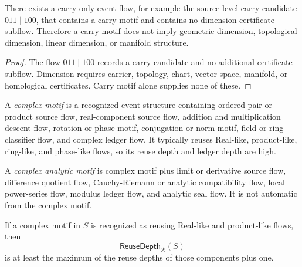\begin{theorem}
\label{thm:higher-case-carry-not-dimension}
There exists a carry-only event flow, for example the source-level carry candidate $011\mid 100$, that contains a carry motif and contains no dimension-certificate subflow. Therefore a carry motif does not imply geometric dimension, topological dimension, linear dimension, or manifold structure.
\end{theorem}

\begin{proof}
The flow $011\mid 100$ records a carry candidate and no additional certificate subflow. Dimension requires carrier, topology, chart, vector-space, manifold, or homological certificates. Carry motif alone supplies none of these.
\end{proof}

\begin{definition}
\label{def:higher-case-complex-motif}
A \emph{complex motif} is a recognized event structure containing ordered-pair or product source flow, real-component source flow, addition and multiplication descent flow, rotation or phase motif, conjugation or norm motif, field or ring classifier flow, and complex ledger flow. It typically reuses Real-like, product-like, ring-like, and phase-like flows, so its reuse depth and ledger depth are high.
\end{definition}

\begin{definition}
\label{def:higher-case-complex-analytic-motif}
A \emph{complex analytic motif} is complex motif plus limit or derivative source flow, difference quotient flow, Cauchy-Riemann or analytic compatibility flow, local power-series flow, modulus ledger flow, and analytic seal flow. It is not automatic from the complex motif.
\end{definition}

\begin{proposition}
\label{prop:higher-case-complex-reuse-depth}
If a complex motif in $S$ is recognized as reusing Real-like and product-like flows, then
$$
  \mathsf{ReuseDepth}_{\mathcal R}(S)
$$
is at least the maximum of the reuse depths of those components plus one.
\end{proposition}

